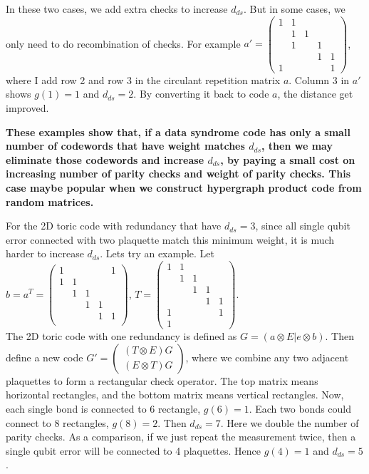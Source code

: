 \documentclass[aps,prb,12pt,tightenlines,%
notitlepage,longbibliography]{revtex4-1}
\begin{document}
In these two cases, we add extra checks to increase $d_{ds}$. But in some cases, we only need to do recombination of checks. For example
$a'=\left( \begin{array}{ccccc}1 & 1 \\  & 1 & 1 & \\ &1& &1\\ &&&1&1\\ 1 &&&&1\end{array} \right)$, where I add row 2 and row 3 in the circulant repetition matrix $a$. Column 3 in $a'$ shows $g(1)=1$ and $d_{ds}=2$. By converting it back to code $a$, the distance get improved.

\textbf{These examples show that, if a data syndrome code has only a small number of codewords that have weight matches $d_{ds}$, then we may eliminate those codewords and increase $d_{ds}$, by paying a small cost on increasing number of parity checks and weight of parity checks. This case maybe popular when we construct hypergraph product code from random matrices.}

For the 2D toric code with redundancy that have $d_{ds}=3$, since all single qubit error connected with two plaquette match this minimum weight, it is much harder to increase $d_{ds}$. Lets try an example. Let\\
$b=a^T=\left( \begin{array}{ccccc} 1&&&&1 \\1 & 1 \\  & 1 & 1 & \\ &&1 &1\\ &&&1&1 \\\end{array} \right)$, 
$T=\left( \begin{array}{ccccc} 1 & 1 \\  & 1 & 1 & \\ &&1 &1\\ &&&1&1 \\ 1&&&&1 \\1\end{array} \right)$.\\
The 2D toric code with one redundancy is defined as 
$G=(a \otimes E |e \otimes b) $.
Then define a new code
$G'=\left( \begin{array}{c} (T \otimes E) G \\ (E \otimes T) G\end{array}\right)  $, where we combine any two adjacent plaquettes to form a rectangular check operator. The top matrix means horizontal rectangles, and the bottom matrix means vertical rectangles. Now, each single bond is connected to 6 rectangle, $g(6)=1$. Each two bonds could connect to 8 rectangles, $g(8)=2$. Then $d_{ds}=7$. Here we double the number of parity checks. 
As a comparison, if we just repeat the measurement twice, then a single qubit error will be connected to 4 plaquettes. Hence $g(4)=1$ and $d_{ds}=5$.



\end{document}
